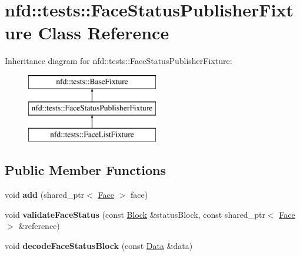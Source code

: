 \hypertarget{classnfd_1_1tests_1_1FaceStatusPublisherFixture}{}\section{nfd\+:\+:tests\+:\+:Face\+Status\+Publisher\+Fixture Class Reference}
\label{classnfd_1_1tests_1_1FaceStatusPublisherFixture}
Inheritance diagram for nfd\+:\+:tests\+:\+:Face\+Status\+Publisher\+Fixture\+:\begin{figure}[H]
\begin{center}
\leavevmode
\includegraphics[height=3.000000cm]{classnfd_1_1tests_1_1FaceStatusPublisherFixture}
\end{center}
\end{figure}
\subsection*{Public Member Functions}
\begin{DoxyCompactItemize}
\item 
void {\bfseries add} (shared\+\_\+ptr$<$ \hyperlink{classnfd_1_1Face}{Face} $>$ face)\hypertarget{classnfd_1_1tests_1_1FaceStatusPublisherFixture_a76e29c506a931fd947ae1b122d4a9776}{}\label{classnfd_1_1tests_1_1FaceStatusPublisherFixture_a76e29c506a931fd947ae1b122d4a9776}

\item 
void {\bfseries validate\+Face\+Status} (const \hyperlink{classndn_1_1Block}{Block} \&status\+Block, const shared\+\_\+ptr$<$ \hyperlink{classnfd_1_1Face}{Face} $>$ \&reference)\hypertarget{classnfd_1_1tests_1_1FaceStatusPublisherFixture_a56bcac2b0276745da7004f19d13befcf}{}\label{classnfd_1_1tests_1_1FaceStatusPublisherFixture_a56bcac2b0276745da7004f19d13befcf}

\item 
void {\bfseries decode\+Face\+Status\+Block} (const \hyperlink{classndn_1_1Data}{Data} \&data)\hypertarget{classnfd_1_1tests_1_1FaceStatusPublisherFixture_a8c51db3ff326170a512f8b72216aed1d}{}\label{classnfd_1_1tests_1_1FaceStatusPublisherFixture_a8c51db3ff326170a512f8b72216aed1d}

\end{DoxyCompactItemize}

